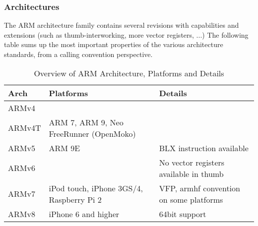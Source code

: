 \newpage


\subsubsection{Architectures}

The ARM architecture family contains several revisions with capabilities and
extensions (such as thumb-interworking, more vector registers, ...)
The following table sums up the most important properties of the various
architecture standards, from a calling convention perspective.


\begin{table}[h]
\begin{tabular*}{0.95\textwidth}{lll}
Arch   & Platforms & Details \\
\hline
ARMv4  &                                          & \\
ARMv4T & ARM 7, ARM 9, Neo FreeRunner (OpenMoko)  & \\
ARMv5  & ARM 9E                                   & BLX instruction available \\
ARMv6  &                                          & No vector registers available in thumb \\
ARMv7  & iPod touch, iPhone 3GS/4, Raspberry Pi 2 & VFP, armhf convention on some platforms \\
ARMv8  & iPhone 6 and higher                      & 64bit support \\
\end{tabular*}
\caption{Overview of ARM Architecture, Platforms and Details}
\end{table}


\newpage

